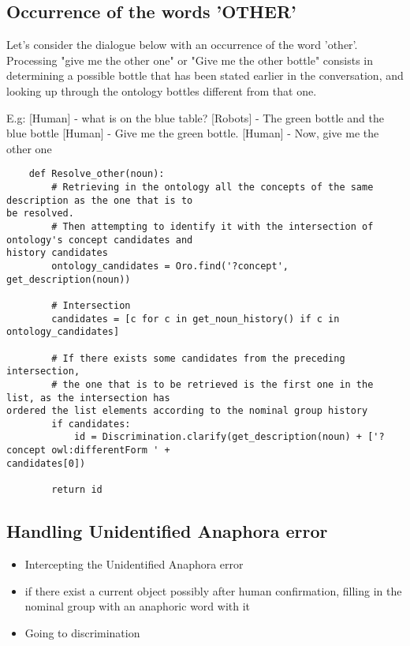 \documentclass[twoside,a4paper,10pt]{report}
\newcommand{\dokutitleleveltree}[1]{\subsection{#1}}
\begin{document}
\dokutitleleveltree{Occurrence of the words 'OTHER'}
\label{b7ebf691f8433bd42593d3ebb2d2c14a}%

Let's consider the dialogue below with an occurrence of the word 'other'. Processing "give me the other one" or "Give me the other bottle" consists in determining a possible bottle that has been stated earlier in the conversation, and looking up through the ontology bottles different from that one.


\small
\begin{verbatimtab}
  E.g:
  [Human]  - what is on the blue table?
  [Robots] - The green bottle and the blue bottle
  [Human]  - Give me the green bottle.
  [Human]  - Now, give me the other one 
\end{verbatimtab}
\normalsize

\lstset{language=python}
\begin{lstlisting}
    def Resolve_other(noun):
        # Retrieving in the ontology all the concepts of the same description as the one that is to
be resolved.
        # Then attempting to identify it with the intersection of ontology's concept candidates and
history candidates
        ontology_candidates = Oro.find('?concept', get_description(noun))
        
        # Intersection
        candidates = [c for c in get_noun_history() if c in ontology_candidates]
        
        # If there exists some candidates from the preceding intersection, 
        # the one that is to be retrieved is the first one in the list, as the intersection has
ordered the list elements according to the nominal group history
        if candidates:
            id = Discrimination.clarify(get_description(noun) + ['?concept owl:differentForm ' +
candidates[0])
                
        return id

\end{lstlisting}

\dokutitleleveltree{Handling Unidentified Anaphora error}
\label{e79def79eebc0ce87924efaa796970ff}%
\begin{itemize}
\item  Intercepting the Unidentified Anaphora error
\item  if there exist a current object possibly after human confirmation, filling in the nominal group with an anaphoric word with it
\item  Going to discrimination
\end{itemize}
\end{document}
